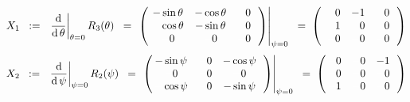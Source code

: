 \vskip 0.5cm
\begin{equation*}
X_{1}
\;\; := \;\;
	\left.\dfrac{\d}{\d\,\theta}\right\vert_{\theta = 0} R_{3}(\theta)
\;\; = \;
	\left.\left(\!
		\begin{array}{ccc}
			{\color{black}-}\sin\theta & {\color{black}-}\cos\theta & {\color{white}-}0 \\
			{\color{white}-}\cos\theta & {\color{black}-}\sin\theta & {\color{white}-}0 \\
			{\color{white}-}0 & {\color{white}-}0 & {\color{white}-}0 \\
			\end{array}
		\,\right)\right\vert_{\psi = 0}
\;\; = \;
	\left(
		\begin{array}{ccc}
			{\color{white}-}0 & {\color{black}-}1 & {\color{white}-}0 \\
			{\color{white}-}1 & {\color{white}-}0 & {\color{white}-}0 \\
			{\color{white}-}0 & {\color{white}-}0 & {\color{white}-}0 \\
			\end{array}
		\,\right)
\end{equation*}
\begin{equation*}
X_{2}
\;\; := \;\;
	\left.\dfrac{\d}{\d\,\psi}\right\vert_{\psi = 0} R_{2}(\psi)
\;\; = \;
	\left.\left(\!\!
		\begin{array}{ccc}
			{\color{black}-}\sin\psi & {\color{white}-}0 & {\color{black}-}\cos\psi \\
			{\color{white}-}0 & {\color{white}-}0 & {\color{white}-}0 \\
			{\color{white}-}\cos\psi & {\color{white}-}0 & {\color{black}-}\sin\psi \\
			\end{array}
		\,\right)\right\vert_{\psi = 0}
\;\; = \;
	\left(\!\!
		\begin{array}{ccc}
			{\color{white}-}0 & {\color{white}-}0 & {\color{black}-}1 \\
			{\color{white}-}0 & {\color{white}-}0 & {\color{white}-}0 \\
			{\color{white}-}1 & {\color{white}-}0 & {\color{white}-}0 \\
			\end{array}
		\,\right)
\end{equation*}
